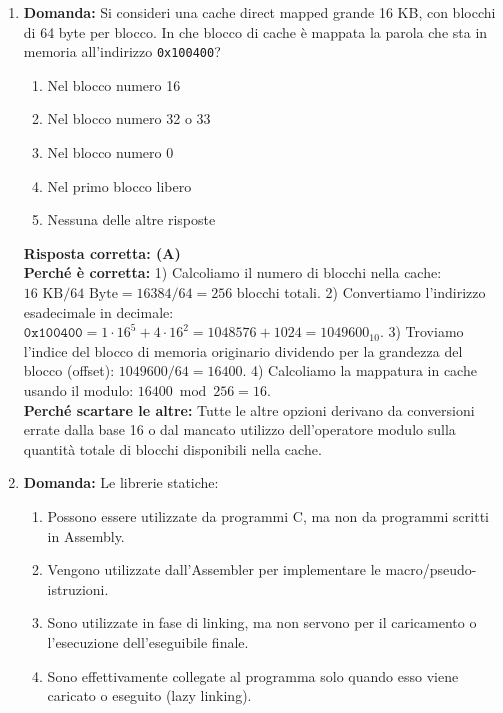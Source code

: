 \documentclass[12pt, a4paper]{article}
\begin{document}
\begin{enumerate}
    \item \textbf{Domanda:} Si consideri una cache direct mapped grande 16 KB, con blocchi di 64 byte per blocco. In che blocco di cache è mappata la parola che sta in memoria all'indirizzo \texttt{0x100400}?
    \begin{enumerate}[label=(\Alph*)]
        \item Nel blocco numero 16
        \item Nel blocco numero 32 o 33
        \item Nel blocco numero 0
        \item Nel primo blocco libero
        \item Nessuna delle altre risposte
    \end{enumerate}
    \textbf{Risposta corretta: (A)} \\
    \textbf{Perché è corretta:} 1) Calcoliamo il numero di blocchi nella cache: $16 \text{ KB} / 64 \text{ Byte} = 16384 / 64 = 256$ blocchi totali. 2) Convertiamo l'indirizzo esadecimale in decimale: $\texttt{0x100400} = 1 \cdot 16^5 + 4 \cdot 16^2 = 1048576 + 1024 = 1049600_{10}$. 3) Troviamo l'indice del blocco di memoria originario dividendo per la grandezza del blocco (offset): $1049600 / 64 = 16400$. 4) Calcoliamo la mappatura in cache usando il modulo: $16400 \bmod 256 = 16$. \\
    \textbf{Perché scartare le altre:} Tutte le altre opzioni derivano da conversioni errate dalla base 16 o dal mancato utilizzo dell'operatore modulo sulla quantità totale di blocchi disponibili nella cache.

    \item \textbf{Domanda:} Le librerie statiche:
    \begin{enumerate}[label=(\Alph*)]
        \item Possono essere utilizzate da programmi C, ma non da programmi scritti in Assembly.
        \item Vengono utilizzate dall'Assembler per implementare le macro/pseudo-istruzioni.
        \item Sono utilizzate in fase di linking, ma non servono per il caricamento o l'esecuzione dell'eseguibile finale.
        \item Sono effettivamente collegate al programma solo quando esso viene caricato o eseguito (lazy linking).
    \end{enumerate}


\end{enumerate}
\end{document}
